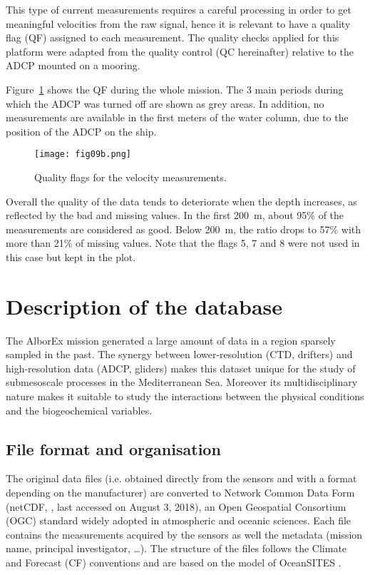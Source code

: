 \documentclass[essd]{copernicus}
\begin{document}
This type of current measurements requires a careful processing in order to get meaningful velocities from the raw signal, hence it is relevant to have a quality flag (QF) assigned to each measurement. The quality checks applied for this platform were adapted from the quality control (QC hereinafter) relative to the ADCP mounted on a mooring.

Figure~\ref{fig9b:adcpQC} shows the QF during the whole mission. The 3 main periods during which the ADCP was turned off are shown as grey areas. In addition, no measurements are available in the first meters of the water column, due to the position of the ADCP on the ship.

\begin{figure}[h]
\texttt{[image: fig09b.png]}
\caption{Quality flags for the velocity measurements.\label{fig9b:adcpQC}}
\end{figure}

Overall the quality of the data tends to deteriorate when the depth increases, as reflected by the bad and missing values. In the first 200~m, about 95\% of the measurements are considered as good. Below 200~m, the ratio drops to 57\% with more than 21\% of missing values. Note that the flags 5, 7 and 8 were not used in this case but kept in the plot.

\section{Description of the database\label{sec:database}}

The AlborEx mission generated a large amount of data in a region sparsely sampled in the past. The synergy between lower-resolution (CTD, drifters) and high-resolution data (ADCP, gliders) makes this dataset unique for the study of submesoscale processes in the Mediterranean Sea. Moreover its multidisciplinary nature makes it suitable to study the interactions between the physical conditions and the biogeochemical variables.

\subsection{File format and organisation}

The original data files (i.e. obtained directly from the sensors and with a format depending on the manufacturer) are converted to Network Common Data Form (netCDF, , last accessed on August 3, 2018), an Open Geospatial Consortium (OGC) standard widely adopted in atmospheric and oceanic sciences. Each file contains the measurements acquired by the sensors as well the metadata (mission name, principal investigator, \ldots). The structure of the files follows the Climate and Forecast (CF) conventions \citep{DOMENICO13} and are based on the model of OceanSITES \citep{SEND2010}. 
\end{document}
